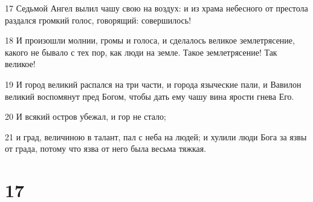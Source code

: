 \par 17 Седьмой Ангел вылил чашу свою на воздух: и из храма небесного от престола раздался громкий голос, говорящий: совершилось!
\par 18 И произошли молнии, громы и голоса, и сделалось великое землетрясение, какого не бывало с тех пор, как люди на земле. Такое землетрясение! Так великое!
\par 19 И город великий распался на три части, и города языческие пали, и Вавилон великий воспомянут пред Богом, чтобы дать ему чашу вина ярости гнева Его.
\par 20 И всякий остров убежал, и гор не стало;
\par 21 и град, величиною в талант, пал с неба на людей; и хулили люди Бога за язвы от града, потому что язва от него была весьма тяжкая.

\chapter{17}

